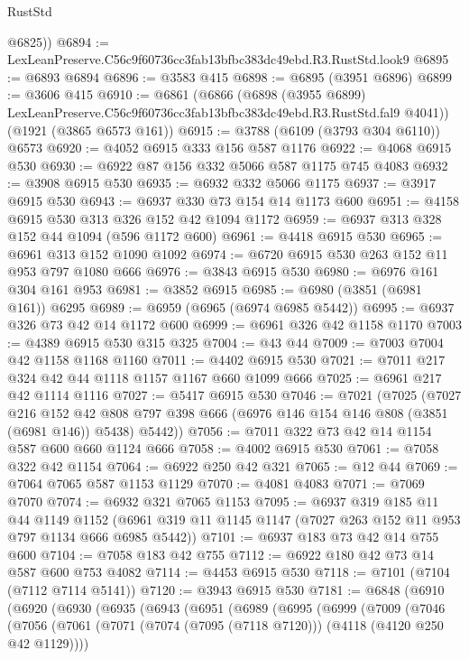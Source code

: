 \begin{lexlean}{RustStd}
\begin{coremodule}
        @6825))
@6894 := LexLeanPreserve.C56c9f60736cc3fab13bfbc383dc49ebd.R3.RustStd.look9
@6895 := @6893 @6894
@6896 := @3583 @415
@6898 := @6895 (@3951 @6896)
@6899 := @3606 @415
@6910 := @6861
    (@6866
      (@6898 (@3955 @6899) LexLeanPreserve.C56c9f60736cc3fab13bfbc383dc49ebd.R3.RustStd.fal9 @4041))
    (@1921 (@3865 @6573 @161))
@6915 := @3788 (@6109 (@3793 @304 @6110)) @6573
@6920 := @4052 @6915 @333 @156 @587 @1176
@6922 := @4068 @6915 @530
@6930 := @6922 @87 @156 @332 @5066 @587 @1175 @745 @4083
@6932 := @3908 @6915 @530
@6935 := @6932 @332 @5066 @1175
@6937 := @3917 @6915 @530
@6943 := @6937 @330 @73 @154 @14 @1173 @600
@6951 := @4158 @6915 @530 @313 @326 @152 @42 @1094 @1172
@6959 := @6937 @313 @328 @152 @44 @1094 (@596 @1172 @600)
@6961 := @4418 @6915 @530
@6965 := @6961 @313 @152 @1090 @1092
@6974 := @6720 @6915 @530 @263 @152 @11 @953 @797 @1080 @666
@6976 := @3843 @6915 @530
@6980 := @6976 @161 @304 @161 @953
@6981 := @3852 @6915
@6985 := @6980 (@3851 (@6981 @161)) @6295
@6989 := @6959 (@6965 (@6974 @6985 @5442))
@6995 := @6937 @326 @73 @42 @14 @1172 @600
@6999 := @6961 @326 @42 @1158 @1170
@7003 := @4389 @6915 @530 @315 @325
@7004 := @43 @44
@7009 := @7003 @7004 @42 @1158 @1168 @1160
@7011 := @4402 @6915 @530
@7021 := @7011 @217 @324 @42 @44 @1118 @1157 @1167 @660 @1099 @666
@7025 := @6961 @217 @42 @1114 @1116
@7027 := @5417 @6915 @530
@7046 := @7021
    (@7025
      (@7027
        @216
        @152
        @42
        @808
        @797
        @398
        @666
        (@6976 @146 @154 @146 @808 (@3851 (@6981 @146)) @5438)
        @5442))
@7056 := @7011 @322 @73 @42 @14 @1154 @587 @600 @660 @1124 @666
@7058 := @4002 @6915 @530
@7061 := @7058 @322 @42 @1154
@7064 := @6922 @250 @42 @321
@7065 := @12 @44
@7069 := @7064 @7065 @587 @1153 @1129
@7070 := @4081 @4083
@7071 := @7069 @7070
@7074 := @6932 @321 @7065 @1153
@7095 := @6937
    @319
    @185
    @11
    @44
    @1149
    @1152
    (@6961 @319 @11 @1145 @1147 (@7027 @263 @152 @11 @953 @797 @1134 @666 @6985 @5442))
@7101 := @6937 @183 @73 @42 @14 @755 @600
@7104 := @7058 @183 @42 @755
@7112 := @6922 @180 @42 @73 @14 @587 @600 @753 @4082
@7114 := @4453 @6915 @530
@7118 := @7101 (@7104 (@7112 @7114 @5141))
@7120 := @3943 @6915 @530
@7181 := @6848
    (@6910
      (@6920
        (@6930
          (@6935
            (@6943
              (@6951
                (@6989
                  (@6995
                    (@6999
                      (@7009
                        (@7046
                          (@7056
                            (@7061
                              (@7071 (@7074 (@7095 (@7118 @7120))) (@4118 (@4120 @250 @42 @1129))))

\end{coremodule}
\end{lexlean}
